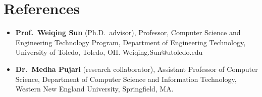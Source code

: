 \documentclass[11pt,letterpaper]{article}
\begin{document}

\section{References}
\begin{itemize}
  \item \textbf{Prof.\ Weiqing Sun} (Ph.D.\ advisor), Professor, Computer Science and
        Engineering Technology Program, Department of Engineering Technology,
        University of Toledo, Toledo, OH. Weiqing.Sun@utoledo.edu
  \item \textbf{Dr.\ Medha Pujari} (research collaborator), Assistant Professor of
        Computer Science, Department of Computer Science and Information Technology,
        Western New England University, Springfield, MA.
\end{itemize}
\end{document}
